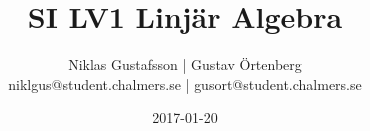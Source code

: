 \documentclass{article}
\title{SI LV1 Linjär Algebra}
\author{Niklas Gustafsson | Gustav Örtenberg  \\ \small{niklgus@student.chalmers.se} | \small{gusort@student.chalmers.se}}
\date{2017-01-20}
\begin{document}
\maketitle
\section{}


\section{}


\section{}


\section{}


\section{}


\section{}

\end{document}

